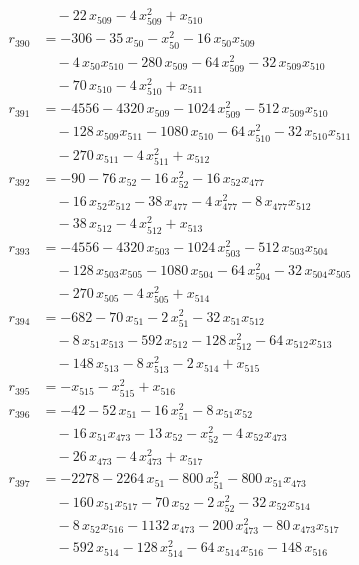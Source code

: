 \begin{align*}
&\quad{}- 22\,x_{509} - 4\,x_{509}^{2} + x_{510} \\
r_{390} &= -306 - 35\,x_{50} - x_{50}^{2} - 16\,x_{50} x_{509} \\
&\quad{}- 4\,x_{50} x_{510} - 280\,x_{509} - 64\,x_{509}^{2} - 32\,x_{509} x_{510} \\
&\quad{}- 70\,x_{510} - 4\,x_{510}^{2} + x_{511} \\
r_{391} &= -4556 - 4320\,x_{509} - 1024\,x_{509}^{2} - 512\,x_{509} x_{510} \\
&\quad{}- 128\,x_{509} x_{511} - 1080\,x_{510} - 64\,x_{510}^{2} - 32\,x_{510} x_{511} \\
&\quad{}- 270\,x_{511} - 4\,x_{511}^{2} + x_{512} \\
r_{392} &= -90 - 76\,x_{52} - 16\,x_{52}^{2} - 16\,x_{52} x_{477} \\
&\quad{}- 16\,x_{52} x_{512} - 38\,x_{477} - 4\,x_{477}^{2} - 8\,x_{477} x_{512} \\
&\quad{}- 38\,x_{512} - 4\,x_{512}^{2} + x_{513} \\
r_{393} &= -4556 - 4320\,x_{503} - 1024\,x_{503}^{2} - 512\,x_{503} x_{504} \\
&\quad{}- 128\,x_{503} x_{505} - 1080\,x_{504} - 64\,x_{504}^{2} - 32\,x_{504} x_{505} \\
&\quad{}- 270\,x_{505} - 4\,x_{505}^{2} + x_{514} \\
r_{394} &= -682 - 70\,x_{51} - 2\,x_{51}^{2} - 32\,x_{51} x_{512} \\
&\quad{}- 8\,x_{51} x_{513} - 592\,x_{512} - 128\,x_{512}^{2} - 64\,x_{512} x_{513} \\
&\quad{}- 148\,x_{513} - 8\,x_{513}^{2} - 2\,x_{514} + x_{515} \\
r_{395} &= -x_{515} - x_{515}^{2} + x_{516} \\
r_{396} &= -42 - 52\,x_{51} - 16\,x_{51}^{2} - 8\,x_{51} x_{52} \\
&\quad{}- 16\,x_{51} x_{473} - 13\,x_{52} - x_{52}^{2} - 4\,x_{52} x_{473} \\
&\quad{}- 26\,x_{473} - 4\,x_{473}^{2} + x_{517} \\
r_{397} &= -2278 - 2264\,x_{51} - 800\,x_{51}^{2} - 800\,x_{51} x_{473} \\
&\quad{}- 160\,x_{51} x_{517} - 70\,x_{52} - 2\,x_{52}^{2} - 32\,x_{52} x_{514} \\
&\quad{}- 8\,x_{52} x_{516} - 1132\,x_{473} - 200\,x_{473}^{2} - 80\,x_{473} x_{517} \\
&\quad{}- 592\,x_{514} - 128\,x_{514}^{2} - 64\,x_{514} x_{516} - 148\,x_{516} \\

\end{align*}
